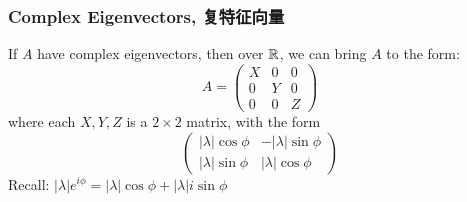 \subsubsection{Complex Eigenvectors, 复特征向量}
If $A$ have complex eigenvectors, then over $\mathbb{R}$, we can bring $A$ to the form:
$$A = \begin{pmatrix}
    X & 0 & 0 \\
    0 & Y & 0 \\
    0 & 0 & Z
\end{pmatrix}$$
where each $X, Y, Z$ is a $2 \times 2$ matrix, with the form
$$\begin{pmatrix}
    |\lambda|\cos{\phi} & -|\lambda|\sin{\phi} \\
    |\lambda|\sin{\phi} & |\lambda|\cos{\phi}
\end{pmatrix}$$
Recall: $|\lambda|e^{i \phi} = |\lambda|\cos{\phi} + |\lambda|i\sin{\phi}$
